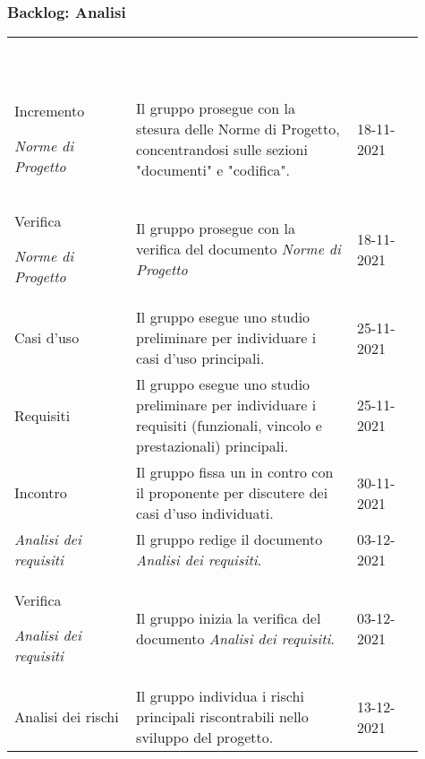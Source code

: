 \subsubsection{Backlog: Analisi}
{\renewcommand{\arraystretch}{1.5}
\begin{longtable}{p{0.27\linewidth}p{0.49\linewidth}p{0.15\linewidth}}
	\rowcolor[RGB]{33, 73, 50}
	\textcolor{white}{\textbf{Titolo attività}} & \textcolor{white}{\textbf{Descrizione}} & \textcolor{white}{\textbf{Data inizio}}\\
    
    \rowcolor[RGB]{216, 235, 171}
    Incremento \par \textit{Norme di Progetto} & Il gruppo prosegue con la stesura delle Norme di Progetto, concentrandosi sulle sezioni "documenti" e "codifica". & 18-11-2021\\

    \rowcolor[RGB]{233, 245, 206}
    Verifica \par \textit{Norme di Progetto} & Il gruppo prosegue con la verifica del documento \textit{Norme di Progetto} & 18-11-2021\\
    
    \rowcolor[RGB]{216, 235, 171}
    Casi d'uso & Il gruppo esegue uno studio preliminare per individuare i casi d'uso principali. & 25-11-2021\\

    \rowcolor[RGB]{233, 245, 206}
    Requisiti & Il gruppo esegue uno studio preliminare per individuare i requisiti (funzionali, vincolo e prestazionali) principali. & 25-11-2021\\

    \rowcolor[RGB]{216, 235, 171}
    Incontro & Il gruppo fissa un in contro con il proponente per discutere dei casi d'uso individuati. & 30-11-2021\\ 
    
    \rowcolor[RGB]{233, 245, 206}
    \textit{Analisi dei requisiti} & Il gruppo redige il documento \textit{Analisi dei requisiti}. & 03-12-2021\\

    \rowcolor[RGB]{216, 235, 171}
    Verifica \par \textit{Analisi dei requisiti} & Il gruppo inizia la verifica del documento \textit{Analisi dei requisiti}. & 03-12-2021\\

    \rowcolor[RGB]{233, 245, 206}
    Analisi dei rischi & Il gruppo individua i rischi principali riscontrabili nello sviluppo del progetto. & 13-12-2021\\


\end{longtable}}
